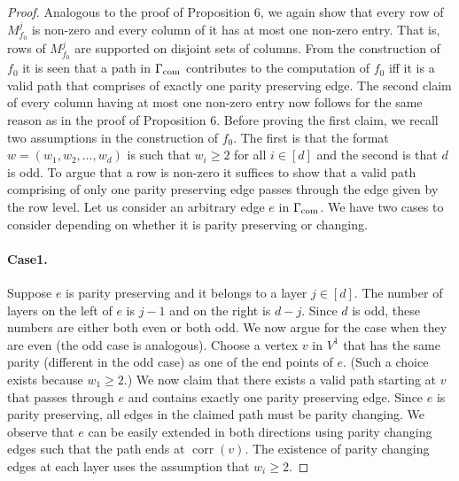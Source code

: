 \documentclass[10pt,a4paper]{article}
\newcommand{\Gcom}{\Gamma_{\rm com}}
\begin{document}
\begin{proof}
Analogous to the proof of Proposition 6, we again show that every row of $M^j_{f_0}$ is non-zero and every column of it has at most one non-zero entry. That is, rows of $M^j_{f_0}$ are supported on disjoint sets of columns.
From the construction of $f_0$ it is seen that a path in $\Gcom$ contributes to the computation of $f_0$ iff it is a valid path that comprises of exactly one parity preserving edge. The second claim of every column having at most one non-zero entry now follows for the same reason as in the proof of Proposition 6.
Before proving the first claim, we recall two assumptions in the construction of $f_0$. The first is that the format $w=(w_1,w_2,\ldots,w_d)$ is such that $w_i\ge2$ for all $i\in[d]$ and the second is that $d$ is odd. To argue that a row is non-zero it suffices to show that a valid path comprising of only one parity preserving edge passes through the edge given by the row level.
Let us consider an arbitrary edge $e$ in $\Gcom$. We have two cases to consider depending on whether it is parity preserving or changing.
\paragraph{Case1.} Suppose $e$ is parity preserving and it belongs to a layer $j\in[d]$. The number of layers on the left of $e$ is $j-1$ and on the right is $d-j$. Since $d$ is odd, these numbers are either both even or both odd. We now argue for the case when they are even (the odd case is analogous). Choose a vertex $v$ in $V^1$ that has the same parity (different in the odd case) as one of the end points of $e$. (Such a choice exists because $w_1\ge2$.) We now claim that there exists a valid path starting at $v$ that passes through $e$ and contains exactly one parity preserving edge. Since $e$ is parity preserving, all edges in the claimed path must be parity changing. We observe that $e$ can be easily extended in both directions using parity changing edges such that the path ends at $\operatorname{corr}(v)$. The existence of parity changing edges at each layer uses the assumption that $w_i\ge2$.

\end{proof}
\end{document}

